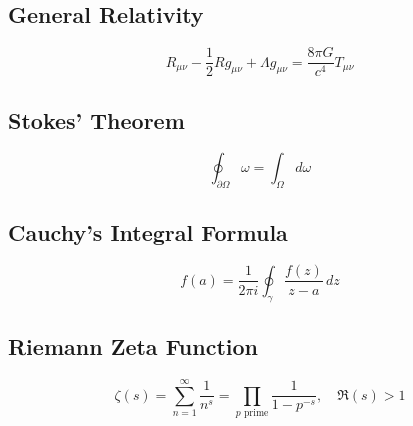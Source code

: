 \documentclass[11pt]{article}
\begin{document}
\subsection{General Relativity}
\begin{equation}
  R_{\mu\nu} - \frac{1}{2}Rg_{\mu\nu} + \Lambda g_{\mu\nu} = \frac{8\pi G}{c^4}T_{\mu\nu}
\end{equation}

\subsection{Stokes' Theorem}
\begin{equation}
  \oint_{\partial \Omega} \omega = \int_{\Omega} d\omega
\end{equation}

\subsection{Cauchy's Integral Formula}
\begin{equation}
  f(a) = \frac{1}{2\pi i} \oint_\gamma \frac{f(z)}{z - a}\,dz
\end{equation}

\subsection{Riemann Zeta Function}
\begin{equation}
  \zeta(s) = \sum_{n=1}^{\infty} \frac{1}{n^s} = \prod_{p \text{ prime}} \frac{1}{1 - p^{-s}}, \quad \Re(s) > 1
\end{equation}
\end{document}
